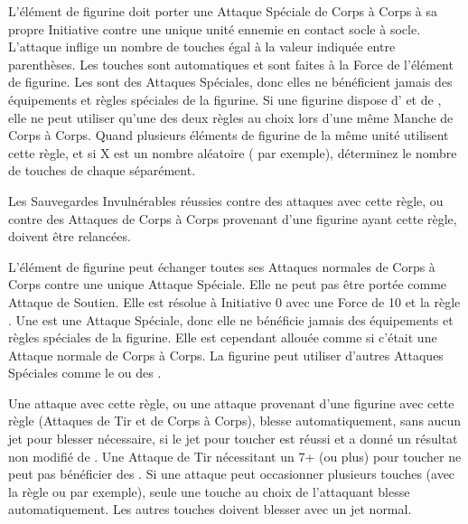 
L'élément de figurine doit porter une Attaque Spéciale de Corps à Corps à sa propre Initiative contre une unique unité ennemie en contact socle à socle. L'attaque inflige un nombre de touches égal à la valeur indiquée entre parenthèses. Les touches sont automatiques et sont faites à la Force de l'élément de figurine. Les \grindingattacks{} sont des Attaques Spéciales, donc elles ne bénéficient jamais des équipements et règles spéciales de la figurine. Si une figurine dispose d'\grindingattacks{} et de \impacthits{}, elle ne peut utiliser qu'une des deux règles au choix lors d'une même Manche de Corps à Corps. Quand plusieurs éléments de figurine de la même unité utilisent cette règle, et si X est un nombre aléatoire ( par exemple), déterminez le nombre de touches de chaque \grindingattacks{} séparément.


Les Sauvegardes Invulnérables réussies contre des attaques avec cette règle, ou contre des Attaques de Corps à Corps provenant d'une figurine ayant cette règle, doivent être relancées.


L'élément de figurine peut échanger toutes ses Attaques normales de Corps à Corps contre une unique Attaque Spéciale. Elle ne peut pas être portée comme Attaque de Soutien. Elle est résolue à Initiative 0 avec une Force de 10 et la règle . Une \crushattack{} est une Attaque Spéciale, donc elle ne bénéficie jamais des équipements et règles spéciales de la figurine. Elle est cependant allouée comme si c'était une Attaque normale de Corps à Corps. La figurine peut utiliser d'autres Attaques Spéciales comme le \stomp{} ou des \impacthits{}.


Une attaque avec cette règle, ou une attaque provenant d'une figurine avec cette règle (Attaques de Tir et de Corps à Corps), blesse automatiquement, sans aucun jet pour blesser nécessaire, si le jet pour toucher est réussi et a donné un résultat non modifié de . Une Attaque de Tir nécessitant un 7+ (ou plus) pour toucher ne peut pas bénéficier des \poisonedattacks{}. Si une attaque peut occasionner plusieurs touches (avec la règle \areaattack{} ou \penetrating{} par exemple), seule une touche au choix de l'attaquant blesse automatiquement. Les autres touches doivent blesser avec un jet normal.

